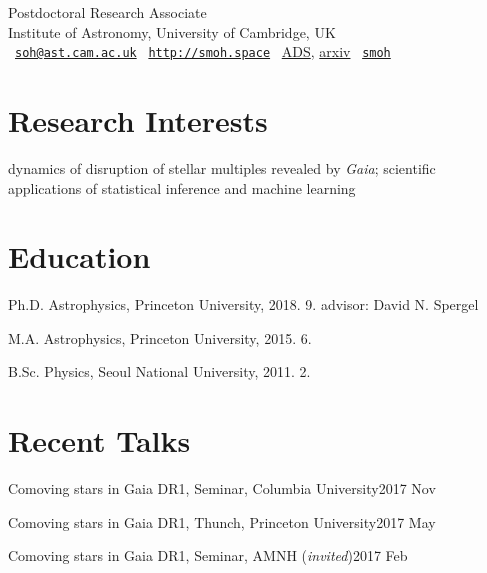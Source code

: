 \documentclass[11pt,letterpaper]{article}
\renewenvironment{itemize}{
  \begin{list}{}{
    \setlength{\leftmargin}{1.em}
  }
}{
  \end{list}
}
\def\name{Semyeong Oh}
\begin{document}
  Postdoctoral Research Associate \\
  Institute of Astronomy, University of Cambridge, UK \\
  \faEnvelope\ \href{mailto:soh@ast.cam.ac.uk}{\tt soh@ast.cam.ac.uk}
  \faHome\ \href{https://smoh.space}{\tt http://smoh.space}
  \faFile*\ \href{https://ui.adsabs.harvard.edu/public-libraries/Slk-d10nSAe9qtCnvfJd8w}{ADS},
    \href{https://arxiv.org/search/?query=semyeong+oh&searchtype=author&abstracts=show&order=-announced_date_first}{arxiv}
    \faGithub\ \href{https://github.com/smoh}{{\tt smoh}}


\section*{Research Interests}

dynamics of disruption of stellar multiples revealed by {\it Gaia};
scientific applications of statistical inference and machine learning

\section*{Education}

\begin{itemize}
  \setlength\itemsep{0em}
  \item Ph.D. Astrophysics, Princeton University, 2018. 9. 
    advisor: David N. Spergel

  \item M.A. Astrophysics, Princeton University, 2015. 6.


  \item B.Sc. Physics, Seoul National University, 2011. 2.
\end{itemize}

\section*{Recent Talks}

\begin{itemize}
  \setlength{\itemsep}{0em}

  \item Comoving stars in Gaia DR1, Seminar, Columbia University\hfill 2017 Nov
  \item Comoving stars in Gaia DR1, Thunch, Princeton University\hfill 2017 May
  \item Comoving stars in Gaia DR1, Seminar, AMNH ({\it invited})\hfill 2017 Feb
\end{itemize}
\end{document}

